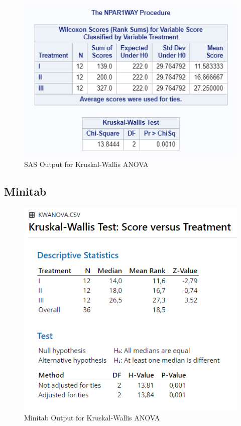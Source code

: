 \documentclass[
]{book}
\begin{document}
\begin{figure}[!h]
\includegraphics{Screenshots/Kruskal-Wallis ANOVA/kwaSAS} \caption{\label{fig:kwaSAS}SAS Output for Kruskal-Wallis ANOVA}\label{fig:kwaSAS}
\end{figure}

\hypertarget{minitab-2}{%
\subsection{Minitab}\label{minitab-2}}

\begin{figure}[!h]
\includegraphics{Screenshots/Kruskal-Wallis ANOVA/kwaMinitab} \caption{\label{fig:kwaMinitab}Minitab Output for Kruskal-Wallis ANOVA}\label{fig:kwaMinitab}
\end{figure}
\end{document}
